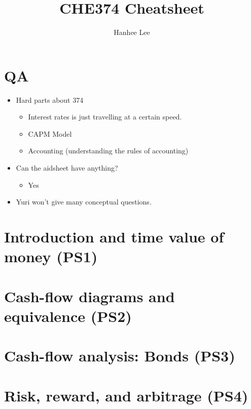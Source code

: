 \documentclass{article}
\title{CHE374 Cheatsheet}
\author{Hanhee Lee}
\begin{document}
\maketitle

\tableofcontents

\listoffigures

\listoftables

\section{QA}
\begin{intuition}
    \begin{itemize}
        \item Hard parts about 374
        \begin{itemize}
            \item Interest rates is just travelling at a certain speed. 
            \item CAPM Model
            \item Accounting (understanding the rules of accounting)
        \end{itemize}
        \item Can the aidsheet have anything?
        \begin{itemize}
            \item Yes
        \end{itemize}
        \item Yuri won't give many conceptual questions.
    \end{itemize}
\end{intuition}

\section{Introduction and time value of money (PS1)}

\newpage

\section{Cash-flow diagrams and equivalence (PS2)}

\newpage

\section{Cash-flow analysis: Bonds (PS3)}

\newpage

\section{Risk, reward, and arbitrage (PS4)} %

\newpage
\end{document}
